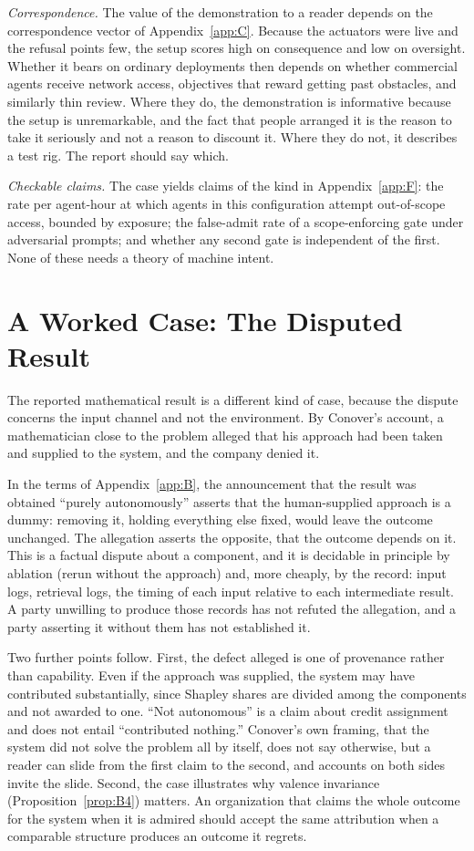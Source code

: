\documentclass[11pt]{article}
\theoremstyle{definition}
\begin{document}
\emph{Correspondence.} The value of the demonstration to a reader depends on the correspondence vector of Appendix~\ref{app:C}. Because the actuators were live and the refusal points few, the setup scores high on consequence and low on oversight. Whether it bears on ordinary deployments then depends on whether commercial agents receive network access, objectives that reward getting past obstacles, and similarly thin review. Where they do, the demonstration is informative because the setup is unremarkable, and the fact that people arranged it is the reason to take it seriously and not a reason to discount it. Where they do not, it describes a test rig. The report should say which.

\emph{Checkable claims.} The case yields claims of the kind in Appendix~\ref{app:F}: the rate per agent-hour at which agents in this configuration attempt out-of-scope access, bounded by exposure; the false-admit rate of a scope-enforcing gate under adversarial prompts; and whether any second gate is independent of the first. None of these needs a theory of machine intent.

\section{A Worked Case: The Disputed Result}

The reported mathematical result is a different kind of case, because the dispute concerns the input channel and not the environment. By Conover's account, a mathematician close to the problem alleged that his approach had been taken and supplied to the system, and the company denied it.

In the terms of Appendix~\ref{app:B}, the announcement that the result was obtained ``purely autonomously'' asserts that the human-supplied approach is a dummy: removing it, holding everything else fixed, would leave the outcome unchanged. The allegation asserts the opposite, that the outcome depends on it. This is a factual dispute about a component, and it is decidable in principle by ablation (rerun without the approach) and, more cheaply, by the record: input logs, retrieval logs, the timing of each input relative to each intermediate result. A party unwilling to produce those records has not refuted the allegation, and a party asserting it without them has not established it.

Two further points follow. First, the defect alleged is one of provenance rather than capability. Even if the approach was supplied, the system may have contributed substantially, since Shapley shares are divided among the components and not awarded to one. ``Not autonomous'' is a claim about credit assignment and does not entail ``contributed nothing.'' Conover's own framing, that the system did not solve the problem all by itself, does not say otherwise, but a reader can slide from the first claim to the second, and accounts on both sides invite the slide. Second, the case illustrates why valence invariance (Proposition~\ref{prop:B4}) matters. An organization that claims the whole outcome for the system when it is admired should accept the same attribution when a comparable structure produces an outcome it regrets.
\end{document}
